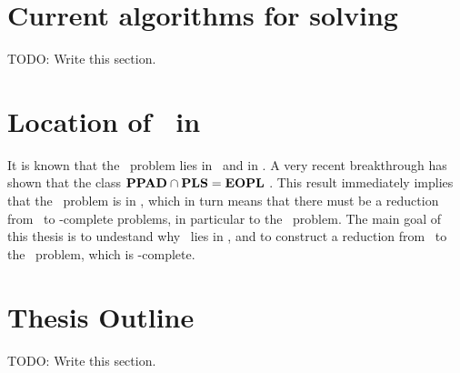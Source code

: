 \section{Current algorithms for solving \Tarski}

TODO: Write this section.

\section{Location of \Tarski\ in \TFNP}
It is known that the \Tarski\ problem lies in \PPAD\ and in \PLS. A very recent breakthrough has shown that the class $\textbf{PPAD} \cap \textbf{PLS} = \textbf{EOPL}$ . This result immediately implies that the \Tarski\ problem is in \EOPL, which in turn means that there must be a reduction from \Tarski\ to \EOPL-complete problems, in particular to the \EndOfPotentialLine\ problem. The main goal of this thesis is to undestand why \Tarski\ lies in \EOPL, and to construct a reduction from \Tarski\ to the \EndOfPotentialLine\ problem, which is \EOPL-complete.

\section{Thesis Outline}

TODO: Write this section.